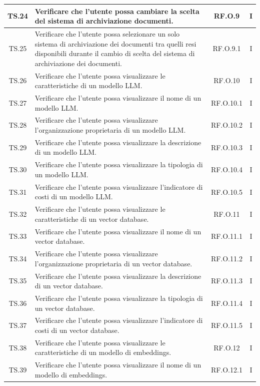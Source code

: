 \documentclass[10pt, a4paper]{article}
\begin{document}
\begin{xltabular}{\textwidth}{|c|X|c|c|}
\hline
TS.24 & Verificare che l'utente possa cambiare la scelta del sistema di archiviazione documenti. & RF.O.9 & I \\
\hline
TS.25 & Verificare che l'utente possa selezionare un solo sistema di archiviazione dei documenti tra quelli resi disponibili durante il cambio di scelta del sistema di archiviazione dei documenti. & RF.O.9.1 & I \\
\hline
TS.26 & Verificare che l'utente possa visualizzare le caratteristiche di un modello LLM. & RF.O.10 & I \\
\hline
TS.27 & Verificare che l'utente possa visualizzare il nome di un modello LLM. & RF.O.10.1 & I \\
\hline
TS.28 & Verificare che l'utente possa visualizzare l’organizzazione proprietaria di un modello LLM. & RF.O.10.2 & I \\
\hline
TS.29 & Verificare che l'utente possa visualizzare la descrizione di un modello LLM. & RF.O.10.3 & I \\
\hline
TS.30 & Verificare che l'utente possa visualizzare la tipologia di un modello LLM. & RF.O.10.4 & I \\
\hline
TS.31 & Verificare che l'utente possa visualizzare l’indicatore di costi di un modello LLM. & RF.O.10.5 & I \\
\hline
TS.32 & Verificare che l'utente possa visualizzare le caratteristiche di un vector database. & RF.O.11 & I \\
\hline
TS.33 & Verificare che l'utente possa visualizzare il nome di un vector database. & RF.O.11.1 & I \\
\hline
TS.34 & Verificare che l'utente possa visualizzare l’organizzazione proprietaria di un vector database. & RF.O.11.2 & I \\
\hline
TS.35 & Verificare che l'utente possa visualizzare la descrizione di un vector database. & RF.O.11.3 & I \\
\hline
TS.36 & Verificare che l'utente possa visualizzare la tipologia di un vector database. & RF.O.11.4 & I \\
\hline
TS.37 & Verificare che l'utente possa visualizzare l’indicatore di costi di un vector database. & RF.O.11.5 & I \\
\hline
TS.38 & Verificare che l'utente possa visualizzare le caratteristiche di un modello di embeddings. & RF.O.12 & I \\
\hline
TS.39 & Verificare che l'utente possa visualizzare il nome di un modello di embeddings. & RF.O.12.1 & I \\

\end{xltabular}
\end{document}
